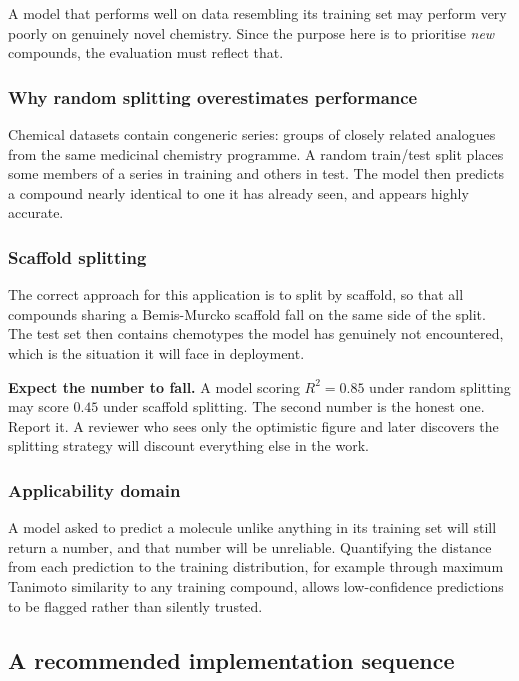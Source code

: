 \documentclass[11pt,a4paper]{article}
\begin{document}
A model that performs well on data resembling its training set may perform very
poorly on genuinely novel chemistry. Since the purpose here is to prioritise
\emph{new} compounds, the evaluation must reflect that.

\subsubsection{Why random splitting overestimates performance}

Chemical datasets contain congeneric series: groups of closely related analogues
from the same medicinal chemistry programme. A random train/test split places
some members of a series in training and others in test. The model then
predicts a compound nearly identical to one it has already seen, and appears
highly accurate.

\subsubsection{Scaffold splitting}

The correct approach for this application is to split by scaffold, so that all
compounds sharing a Bemis-Murcko scaffold fall on the same side of the split.
The test set then contains chemotypes the model has genuinely not encountered,
which is the situation it will face in deployment.

\begin{keybox}
\textbf{Expect the number to fall.} A model scoring $R^2 = 0.85$ under random
splitting may score $0.45$ under scaffold splitting. The second number is the
honest one. Report it. A reviewer who sees only the optimistic figure and later
discovers the splitting strategy will discount everything else in the work.
\end{keybox}

\subsubsection{Applicability domain}

A model asked to predict a molecule unlike anything in its training set will
still return a number, and that number will be unreliable. Quantifying the
distance from each prediction to the training distribution, for example through
maximum Tanimoto similarity to any training compound, allows low-confidence
predictions to be flagged rather than silently trusted.

\subsection{A recommended implementation sequence}
\end{document}
